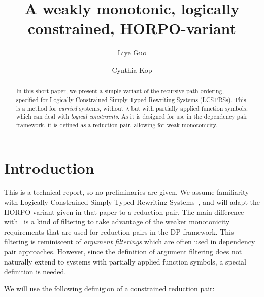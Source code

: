 \documentclass[a4paper,USenglish,cleveref,autoref,thm-restate]{lipics-v2021}
\title{A weakly monotonic, logically constrained, HORPO-variant}
\author{Liye Guo}{Radboud University, Nijmegen, The Netherlands}{l.guo@cs.ru.nl}{https://orcid.org/0000-0002-3064-2691}{}
\author{Cynthia Kop}{Radboud University, Nijmegen, The Netherlands}{c.kop@cs.ru.nl}{https://orcid.org/0000-0002-6337-2544}{}
\begin{document}
\maketitle

\begin{abstract}
In this short paper, we present a simple variant of the recursive path ordering, specified for
Logically Constrained Simply Typed Rewriting Systems (LCSTRSs).  This is a method for
\emph{curried} systems, without $\lambda$ but with partially applied function symbols, which can
deal with \emph{logical constraints}.  As it is designed for use in the dependency pair framework,
it is defined as a reduction pair, allowing for weak monotonicity.
\end{abstract}

\section{Introduction}

This is a technical report, so no preliminaries are given.
We assume familiarity with Logically Constrained Simply Typed Rewriting Systems~\cite{guo:kop:24},
and will adapt the HORPO variant given in that paper to a reduction pair.
The main difference with~\cite{guo:kop:24} is a kind of filtering to take advantage of the weaker
monotonicity requirements that are used for reduction pairs in the DP framework.  This filtering is
reminiscent of \emph{argument filterings} which are often used in dependency pair approaches.
However, since the definition of argument filtering does not naturally extend to systems with
partially applied function symbols, a special definition is needed.

We will use the following definigion of a constrained reduction pair:
\end{document}
